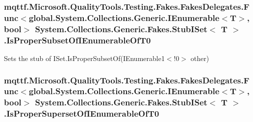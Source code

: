 \hypertarget{class_system_1_1_collections_1_1_generic_1_1_fakes_1_1_stub_i_set_3_01_t_01_4_a95a094b7fd75776f64074f138ebea1a7}{
\subsubsection[{Is\-Proper\-Subset\-Of\-I\-Enumerable\-Of\-T0}]{\setlength{\rightskip}{0pt plus 5cm}mqttf.\-Microsoft.\-Quality\-Tools.\-Testing.\-Fakes.\-Fakes\-Delegates.\-Func$<$global.\-System.\-Collections.\-Generic.\-I\-Enumerable$<$T$>$, bool$>$ System.\-Collections.\-Generic.\-Fakes.\-Stub\-I\-Set$<$ T $>$.Is\-Proper\-Subset\-Of\-I\-Enumerable\-Of\-T0}}\label{class_system_1_1_collections_1_1_generic_1_1_fakes_1_1_stub_i_set_3_01_t_01_4_a95a094b7fd75776f64074f138ebea1a7}


Sets the stub of I\-Set{.\-Is\-Proper\-Subset\-Of(I\-Enumerable}1$<$!0$>$ other)

\hypertarget{class_system_1_1_collections_1_1_generic_1_1_fakes_1_1_stub_i_set_3_01_t_01_4_a4dab5fa4d0fc626c286f50ba4e83efd5}{
\subsubsection[{Is\-Proper\-Superset\-Of\-I\-Enumerable\-Of\-T0}]{\setlength{\rightskip}{0pt plus 5cm}mqttf.\-Microsoft.\-Quality\-Tools.\-Testing.\-Fakes.\-Fakes\-Delegates.\-Func$<$global.\-System.\-Collections.\-Generic.\-I\-Enumerable$<$T$>$, bool$>$ System.\-Collections.\-Generic.\-Fakes.\-Stub\-I\-Set$<$ T $>$.Is\-Proper\-Superset\-Of\-I\-Enumerable\-Of\-T0}}\label{class_system_1_1_collections_1_1_generic_1_1_fakes_1_1_stub_i_set_3_01_t_01_4_a4dab5fa4d0fc626c286f50ba4e83efd5}


